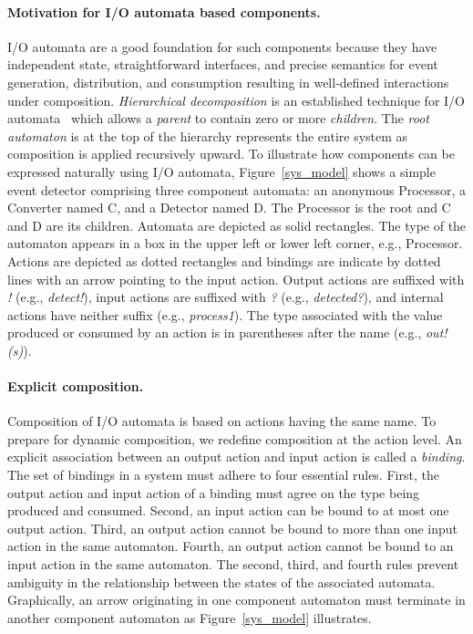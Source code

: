 \paragraph*{Motivation for I/O automata based components.}
I/O automata are a good foundation for such components because they have independent state, straightforward interfaces, and precise semantics for event generation, distribution, and consumption resulting in well-defined interactions under composition.
\emph{Hierarchical decomposition} is an established technique for I/O automata~\cite{lynch1994atomic} which allows a \emph{parent} to contain zero or more \emph{children}.
The \emph{root automaton} is at the top of the hierarchy represents the entire system as composition is applied recursively upward.
To illustrate how components can be expressed naturally using I/O automata, Figure~\ref{sys_model} shows a simple event detector comprising three component automata: an anonymous Processor, a Converter named C, and a Detector named D. 
The Processor is the root and C and D are its children.
Automata are depicted as solid rectangles. The type of the automaton appears in a box in the upper left or lower left corner, e.g., Processor.
Actions are depicted as dotted rectangles and bindings are indicate by dotted lines with an arrow pointing to the input action.
Output actions are suffixed with \emph{!} (e.g., \emph{detect!}), input actions are suffixed with \emph{?} (e.g., \emph{detected?}), and internal actions have neither suffix (e.g., \emph{process1}).
The type associated with the value produced or consumed by an action is in parentheses after the name (e.g., \emph{out!(s)}).

\paragraph*{Explicit composition.}
Composition of I/O automata is based on actions having the same name.
To prepare for dynamic composition, we redefine composition at the action level.
An explicit association between an output action and input action is called a \emph{binding}.
The set of bindings in a system must adhere to four essential rules.
First, the output action and input action of a binding must agree on the type being produced and consumed.
Second, an input action can be bound to at most one output action.
Third, an output action cannot be bound to more than one input action in the same automaton.
Fourth, an output action cannot be bound to an input action in the same automaton.
The second, third, and fourth rules prevent ambiguity in the relationship between the states of the associated automata.
Graphically, an arrow originating in one component automaton must terminate in another component automaton as Figure~\ref{sys_model} illustrates.

